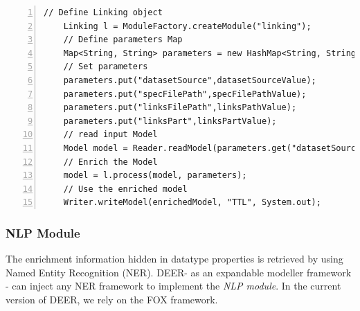 \documentclass[a4paper,twoside,bibtotoc,abstracton,12pt,BCOR=15mm]{article}
\newcommand{\geolift}{\textsc{DEER}\xspace}
\begin{document}
    
    
    \begingroup
	\fontsize{8pt}{10pt}\selectfont
    \begin{lstlisting}[label=lst:Linking, float=tp, numbers=left, numberstyle=\tiny, caption = Code fragment to call the \texttt{Linking} class.]
    // Define Linking object
    Linking l = ModuleFactory.createModule("linking");
    // Define parameters Map
    Map<String, String> parameters = new HashMap<String, String>();
    // Set parameters
    parameters.put("datasetSource",datasetSourceValue);
    parameters.put("specFilePath",specFilePathValue);
    parameters.put("linksFilePath",linksPathValue);
    parameters.put("linksPart",linksPartValue);
    // read input Model
    Model model = Reader.readModel(parameters.get("datasetSource"));
    // Enrich the Model
    model = l.process(model, parameters);
    // Use the enriched model
    Writer.writeModel(enrichedModel, "TTL", System.out);
    \end{lstlisting}
    \endgroup

    \subsubsection{NLP Module}
	The enrichment information hidden in datatype properties is retrieved by using Named Entity Recognition (NER).
	\geolift - as an expandable modeller framework - can inject any NER framework to implement the \emph{NLP module}.
	In the current version of \geolift, we rely on the FOX framework. 
\end{document}
